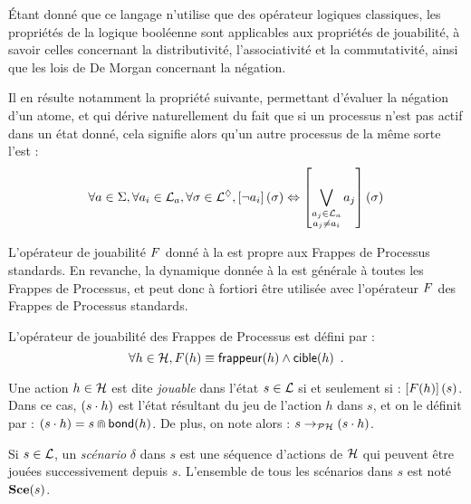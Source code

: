 Étant donné que ce langage n'utilise que des opérateur logiques classiques,
les propriétés de la logique booléenne sont applicables aux propriétés de jouabilité,
à savoir celles concernant la distributivité, l'associativité et la commutativité,
ainsi que les lois de De Morgan concernant la négation.

Il en résulte notamment la propriété suivante, permettant d'évaluer la négation d'un atome,
et qui dérive naturellement du fait que si un processus n'est pas actif dans un état donné,
cela signifie alors qu'un autre processus de la même sorte l'est :
\[\forall a \in \Sigma, \forall a_i \in \mathcal{L}_a, \forall \sigma \in \mathcal{L}^\lozenge,
  \left[\neg a_i\right](\sigma) \Leftrightarrow
  \left[\bigvee_{\substack{a_j \in \mathcal{L}_a\\a_j \neq a_i}} a_j\right](\sigma)\]


L'opérateur de jouabilité $F$ donné à la  est propre aux
Frappes de Processus standards.
En revanche, la dynamique donnée à la  est générale à toutes les
Frappes de Processus, et peut donc à fortiori être utilisée avec l'opérateur $F$
des Frappes de Processus standards.

\begin{definition}
  L'opérateur de jouabilité des Frappes de Processus est défini par :
  \[\forall h \in \mathcal{H}, F(h) \equiv \mathsf{frappeur}(h) \wedge \mathsf{cible}(h) \enspace.\]
\end{definition}

\begin{definition}
  Une action $h \in \mathcal{H}$ est dite \emph{jouable}
  dans l'état $s \in \mathcal{L}$ si et seulement si :
  $\left[F(h)\right](s)$.
  Dans ce cas, $(s \cdot h)$ est l'état résultant du jeu de l'action $h$ dans $s$,
  et on le définit par : $(s \cdot h) = s \Cap \mathsf{bond}(h)$.
  De plus, on note alors : $s \rightarrow_{\mathcal{PH}} (s \cdot h)$.

  Si $s \in \mathcal{L}$, un \emph{scénario} $\delta$ dans $s$
  est une séquence d'actions de $\mathcal{H}$ qui peuvent être jouées successivement depuis $s$.
  L'ensemble de tous les scénarios dans $s$ est noté $\mathbf{Sce}(s)$.
\end{definition}



